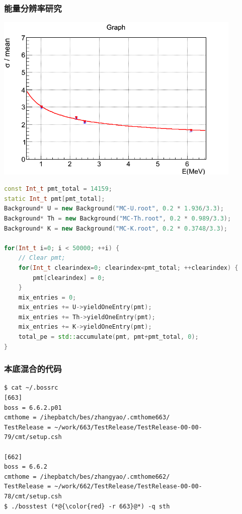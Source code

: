 \begin{frame}
    \frametitle{能量分辨率研究}
    \includegraphics[height=8cm,keepaspectratio]{data/sigma.png}
\end{frame}

\newsavebox{\BackgroundTest}
\begin{lrbox}{\BackgroundTest}
\begin{lstlisting}[language=C++]
const Int_t pmt_total = 14159;
static Int_t pmt[pmt_total];
Background* U = new Background("MC-U.root", 0.2 * 1.936/3.3);
Background* Th = new Background("MC-Th.root", 0.2 * 0.989/3.3);
Background* K = new Background("MC-K.root", 0.2 * 0.3748/3.3);     

for(Int_t i=0; i < 50000; ++i) {
    // Clear pmt;
    for(Int_t clearindex=0; clearindex<pmt_total; ++clearindex) {
        pmt[clearindex] = 0;
    }
    mix_entries = 0;
    mix_entries += U->yieldOneEntry(pmt);
    mix_entries += Th->yieldOneEntry(pmt);
    mix_entries += K->yieldOneEntry(pmt);
    total_pe = std::accumulate(pmt, pmt+pmt_total, 0);
}

\end{lstlisting}
\end{lrbox}

\begin{frame}
    \frametitle{本底混合的代码}
    \par\usebox{\BackgroundTest}
\end{frame}


\newsavebox{\ZhangYaoBossScript}
\begin{lrbox}{\ZhangYaoBossScript}
\begin{lstlisting}
$ cat ~/.bossrc 
[663]
boss = 6.6.2.p01
cmthome = /ihepbatch/bes/zhangyao/.cmthome663/
TestRelease = ~/work/663/TestRelease/TestRelease-00-00-79/cmt/setup.csh

[662]
boss = 6.6.2
cmthome = /ihepbatch/bes/zhangyao/.cmthome662/
TestRelease = ~/work/662/TestRelease/TestRelease-00-00-78/cmt/setup.csh
$ ./bosstest (*@{\color{red} -r 663}@*) -q sth
\end{lstlisting}
\end{lrbox}

